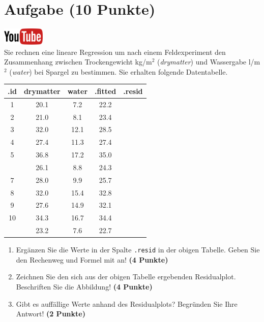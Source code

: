 \documentclass[a4paper, 9pt]{scrartcl}\usepackage[]{graphicx}\usepackage[]{xcolor}
\newenvironment{knitrout}{}{} %
\begin{document}
 
\clearpage

\section{Aufgabe \hfill (10 Punkte)}

\hfill\href{https://youtu.be/dyQlYV9nOqY}{\includegraphics[width =
  2cm]{img/youtube}}\\[1Ex]

Sie rechnen eine lineare Regression um nach einem Feldexperiment den
Zusammenhang zwischen Trockengewicht kg/m$^2$ (\textit{drymatter}) und
Wassergabe l/m$^2$ (\textit{water}) bei Spargel zu bestimmen. Sie erhalten
folgende Datentabelle.

\begin{knitrout}
\color{fgcolor}\begin{table}[!h]
\centering\begingroup\fontsize{12}{14}\selectfont

\begin{tabular}{ccccc}
\toprule
.id & drymatter & water & .fitted & .resid\\
\midrule
1 & 20.1 & 7.2 & 22.2 & \\
2 & 21.0 & 8.1 & 23.4 & \\
3 & 32.0 & 12.1 & 28.5 & \\
4 & 27.4 & 11.3 & 27.4 & \\
5 & 36.8 & 17.2 & 35.0 & \\
\addlinespace
6 & 26.1 & 8.8 & 24.3 & \\
7 & 28.0 & 9.9 & 25.7 & \\
8 & 32.0 & 15.4 & 32.8 & \\
9 & 27.6 & 14.9 & 32.1 & \\
10 & 34.3 & 16.7 & 34.4 & \\
\addlinespace
11 & 23.2 & 7.6 & 22.7 & \\
\bottomrule
\end{tabular}
\endgroup{}
\end{table}

\end{knitrout}

\begin{enumerate}
\item Erg{\"a}nzen Sie die Werte in der Spalte \texttt{.resid} in der obigen
  Tabelle. Geben Sie den Rechenweg und Formel mit an! \textbf{(4 Punkte)}
\item Zeichnen Sie den sich aus der obigen Tabelle ergebenden
  Residualplot. Beschriften Sie die Abbildung! \textbf{(4 Punkte)}
\item Gibt es auff{\"a}llige Werte anhand des Residualplots? Begr{\"u}nden Sie Ihre
  Antwort! \textbf{(2 Punkte)}
\end{enumerate}
 
\end{document}
